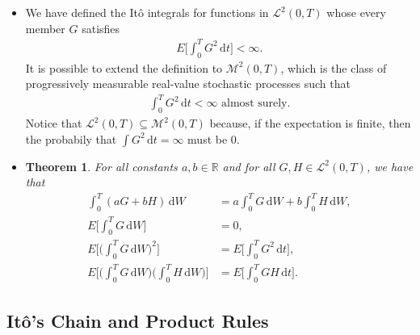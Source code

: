 \documentclass[10pt]{article}
\newtheorem{theorem}[lemma]{Theorem}
\newcommand{\dee}{\mathrm{d}}
\newcommand{\mcal}[1]{\mathcal{#1}}
\newcommand{\Real}{\mathbb{R}}
\begin{document}
\begin{itemize}
  \item We have defined the It\^{o} integrals for functions in $\mcal{L}^2(0,T)$ whose every member $G$ satisfies
  \begin{align*}
    E \bigg[\int_0^T G^2\, \dee t\bigg] < \infty.
  \end{align*}
  It is possible to extend the definition to $\mcal{M}^2(0,T)$, which is the class of progressively measurable real-value stochastic processes such that
  \begin{align*}
    \int_0^T G^2\, \dee t < \infty \mbox{ almost surely.}
  \end{align*}
  Notice that $\mcal{L}^2(0,T) \subseteq \mcal{M}^2(0,T)$ because, if the expectation is finite, then the probabily that $\int G^2\, \dee t = \infty$ must be $0$.

  \item \begin{theorem} \label{theorem:ito-integral-properties}
    For all constants $a, b \in \Real$ and for all $G, H \in \mcal{L}^2(0,T)$, we have that
    \begin{align*}
      \int_0^T (aG + bH)\, \dee W &= a \int_0^T G\, \dee W + b \int_0^T H\, \dee W, \\
      E\bigg[ \int_0^T G\, \dee W \bigg] &= 0, \\
      E\bigg[ \bigg( \int_0^T G\, \dee W \bigg)^2 \bigg] &= E \bigg[ \int_0^T G^2\, \dee t \bigg], \\
      E\bigg[ \bigg( \int_0^T G\, \dee W \bigg) \bigg( \int_0^T H\, \dee W \bigg) \bigg] &= E \bigg[ \int_0^T GH \, \dee t \bigg]. 
    \end{align*}
  \end{theorem}
\end{itemize}

\subsection{It\^{o}'s Chain and Product Rules}
\end{document}
